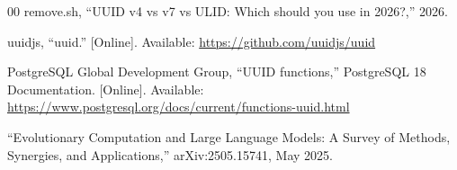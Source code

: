 \documentclass[conference]{IEEEtran}
\begin{document}
\begin{thebibliography}{00}
remove.sh, ``UUID v4 vs v7 vs ULID: Which should you use in 2026?,'' 2026.

uuidjs, ``uuid.'' [Online]. Available: \url{https://github.com/uuidjs/uuid}

PostgreSQL Global Development Group, ``UUID functions,'' PostgreSQL 18 Documentation. [Online]. Available: \url{https://www.postgresql.org/docs/current/functions-uuid.html}

``Evolutionary Computation and Large Language Models: A Survey of Methods, Synergies, and Applications,'' arXiv:2505.15741, May 2025.

\end{thebibliography}
\end{document}
